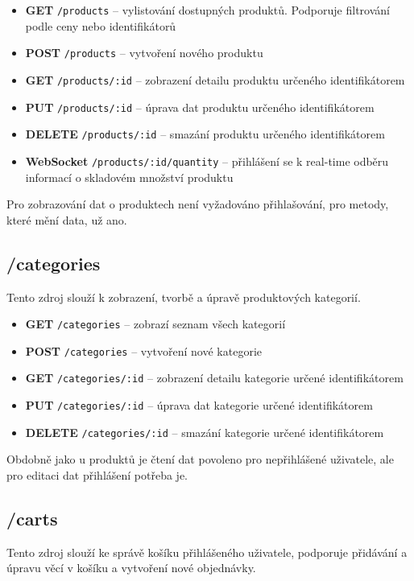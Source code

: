 \documentclass[thesis=M,czech]{FITthesis}[2019/12/23]
\begin{document}
\begin{itemize}
  \item \textbf{GET} \texttt{/products} -- vylistování dostupných produktů. Podporuje filtrování podle ceny nebo identifikátorů
  \item \textbf{POST} \texttt{/products} -- vytvoření nového produktu
  \item \textbf{GET} \texttt{/products/:id} -- zobrazení detailu produktu určeného identifikátorem
  \item \textbf{PUT} \texttt{/products/:id} -- úprava dat produktu určeného identifikátorem
  \item \textbf{DELETE} \texttt{/products/:id} -- smazání produktu určeného identifikátorem
  \item \textbf{WebSocket} \texttt{/products/:id/quantity} -- přihlášení se k real-time odběru informací o skladovém množství produktu
\end{itemize}

Pro zobrazování dat o produktech není vyžadováno přihlašování, pro metody, které mění data, už ano.

\subsection{/categories}
Tento zdroj slouží k zobrazení, tvorbě a úpravě produktových kategorií.

\begin{itemize}
  \item \textbf{GET} \texttt{/categories} -- zobrazí seznam všech kategorií
  \item \textbf{POST} \texttt{/categories} -- vytvoření nové kategorie
  \item \textbf{GET} \texttt{/categories/:id} -- zobrazení detailu kategorie určené identifikátorem
  \item \textbf{PUT} \texttt{/categories/:id} -- úprava dat kategorie určené identifikátorem
  \item \textbf{DELETE} \texttt{/categories/:id} -- smazání kategorie určené identifikátorem
\end{itemize}

Obdobně jako u produktů je čtení dat povoleno pro nepřihlášené uživatele, ale pro editaci dat přihlášení potřeba je.

\subsection{/carts}
Tento zdroj slouží ke správě košíku přihlášeného uživatele, podporuje přidávání a úpravu věcí v košíku a vytvoření nové objednávky.
\end{document}
